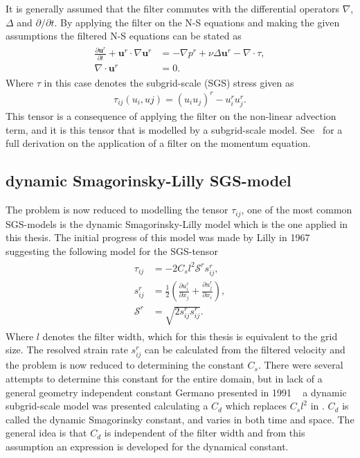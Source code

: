 It is generally assumed that the filter commutes with 
the differential operators $\nabla$, $\Delta$ and $\partial / \partial t$. By applying the filter on the N-S equations
and making the given assumptions the filtered N-S equations can be stated as 
%
\begin{align}
    \begin{split}
        \frac{\partial \mathbf{u}^r}{\partial t} + \mathbf{u}^r\cdot \nabla\mathbf{u}^r
        &= -\nabla p^r +\nu\Delta \mathbf{u}^r-\nabla \cdot \tau, \\
        \nabla \cdot \mathbf{u}^r &= 0.
    \end{split}
	\label{eq:NSfiltered}
\end{align}
%
Where $\tau$ in this case denotes the subgrid-scale (SGS) stress given as 
\begin{align}
    \tau_{ij}(u_i,uj) = (u_iu_j)^r -u_i^ru_j^r.
    \label{eq:sgstensor}
\end{align}
%
This tensor is a consequence of applying the filter on the non-linear advection term, 
and it is this tensor that is modelled by a subgrid-scale model. See~\cite{Pope} for a full derivation on the 
application of a filter on the momentum equation. 

\subsection{dynamic Smagorinsky-Lilly SGS-model}
The problem is now reduced to modelling the tensor $\tau_{ij}$, one of the most common SGS-models is the 
dynamic Smagorinsky-Lilly model which is the one applied in this thesis. The initial progress of this model was made by 
Lilly in 1967~\cite{Lilly67} suggesting the following model for the SGS-tensor
%
\begin{align}
    \begin{split}
    \tau_{ij} &= -2C_sl^2\mathcal{S}^rs_{ij}^r,\\
    s^r_{ij} &= \frac{1}{2}\left( \frac{\partial u^r_i}{\partial x_j} +
    \frac{\partial u^r_j}{\partial x_i}\right),\\
    \mathcal{S}^r &= \sqrt{2s^r_{ij}s^r_{ij}}.
    \end{split}
    \label{eq:boussinesq}
\end{align}
%
Where $l$ denotes the filter width, which for this thesis is equivalent to the grid size.
The resolved strain rate $s^r_{ij}$ can be calculated from the filtered velocity and the problem is now reduced to determining
the constant $C_s$. There were several attempts to determine this constant for the entire domain, but in lack of a general 
geometry independent constant Germano presented in 1991 ~\cite{Germano91} a dynamic subgrid-scale model was presented calculating a 
$C_d$ which replaces $C_sl^2$ in . $C_d$ is called the dynamic Smagorinsky constant, and varies in both time and space.
The general idea is that $C_d$ is independent of the filter width and from this 
assumption an expression is developed for the dynamical constant.

